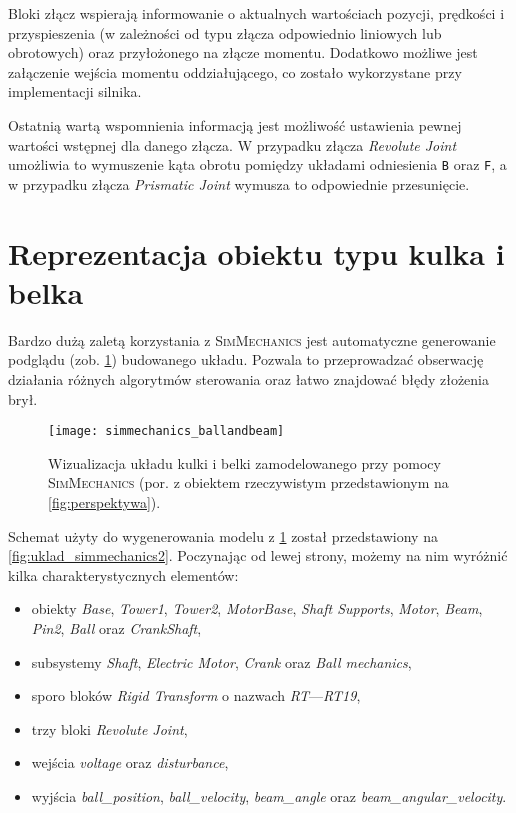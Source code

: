 Bloki złącz wspierają informowanie o aktualnych wartościach pozycji, prędkości i przyspieszenia (w zależności od typu złącza odpowiednio liniowych lub obrotowych) oraz przyłożonego na złącze momentu. Dodatkowo możliwe jest załączenie wejścia momentu oddziałującego, co zostało wykorzystane przy implementacji silnika.

Ostatnią wartą wspomnienia informacją jest możliwość ustawienia pewnej wartości wstępnej dla danego złącza. W przypadku złącza \textit{Revolute Joint} umożliwia to wymuszenie kąta obrotu pomiędzy układami odniesienia \texttt{B} oraz \texttt{F}, a w przypadku złącza \textit{Prismatic Joint} wymusza to odpowiednie przesunięcie.

\section{Reprezentacja obiektu typu kulka i belka}
\label{sec:ch4_reprezentacja_obiektu_kulka_i_belka}

Bardzo dużą zaletą korzystania z \textsc{SimMechanics} jest automatyczne generowanie podglądu (zob. \cref{fig:uklad_simmechanics}) budowanego układu. Pozwala to przeprowadzać obserwację działania różnych algorytmów sterowania oraz łatwo znajdować błędy złożenia brył.

\begin{figure}[H]
    \centering
    \texttt{[image: simmechanics\_ballandbeam]}
    \caption{Wizualizacja układu kulki i belki zamodelowanego przy pomocy \textsc{SimMechanics} (por. z obiektem rzeczywistym przedstawionym na \cref{fig:perspektywa}).}
    \label{fig:uklad_simmechanics}
\end{figure}

Schemat użyty do wygenerowania modelu z \cref{fig:uklad_simmechanics} został przedstawiony na \cref{fig:uklad_simmechanics2}. Poczynając od lewej strony, możemy na nim wyróżnić kilka charakterystycznych elementów:

\begin{itemize}
    \item obiekty \textit{Base}, \textit{Tower1}, \textit{Tower2}, \textit{MotorBase}, \textit{Shaft Supports}, \textit{Motor}, \textit{Beam}, \textit{Pin2}, \textit{Ball} oraz \textit{CrankShaft},
    \item subsystemy \textit{Shaft}, \textit{Electric Motor}, \textit{Crank} oraz \textit{Ball mechanics},
    \item sporo bloków \textit{Rigid Transform} o nazwach \textit{RT}---\textit{RT19},
    \item trzy bloki \textit{Revolute Joint},
    \item wejścia \textit{voltage} oraz \textit{disturbance},
    \item wyjścia \textit{ball\_position}, \textit{ball\_velocity}, \textit{beam\_angle} oraz \textit{beam\_angular\_velocity}.
\end{itemize}


